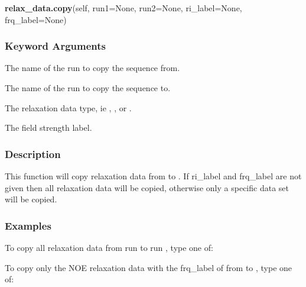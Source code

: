 \textsf{\textbf{relax\_data.copy}(self, run1=None, run2=None, ri\_label=None, frq\_label=None)}


\subsubsection{Keyword Arguments}


  The name of the run to copy the sequence from.

  The name of the run to copy the sequence to.

  The relaxation data type, ie 
, 
, or 
.

  The field strength label.

\subsubsection{Description}

This function will copy relaxation data from 
 to 
.  If ri\_label and frq\_label
are not given then all relaxation data will be copied, otherwise only a specific data set
will be copied.


\subsubsection{Examples}

To copy all relaxation data from run 
 to run 
, type one of:






To copy only the NOE relaxation data with the frq\_label of 
 from 
 to 
, type one
of:





\newpage

